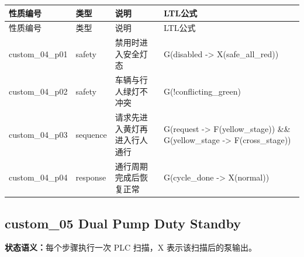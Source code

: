 \begin{longtable}{L{2.3cm}L{1.7cm}L{4.1cm}L{5.2cm}}

\toprule

性质编号 & 类型 & 说明 & LTL公式\\

\midrule

\endfirsthead

\toprule

性质编号 & 类型 & 说明 & LTL公式\\

\midrule

\endhead

{\ttfamily custom\_04\_p01} & safety & 禁用时进入安全灯态 & {\ttfamily G(disabled -> X(safe\_all\_red))}\\

{\ttfamily custom\_04\_p02} & safety & 车辆与行人绿灯不冲突 & {\ttfamily G(!conflicting\_green)}\\

{\ttfamily custom\_04\_p03} & sequence & 请求先进入黄灯再进入行人通行 & {\ttfamily G(request -> F(yellow\_stage)) \&\& G(yellow\_stage -> F(cross\_stage))}\\

{\ttfamily custom\_04\_p04} & response & 通行周期完成后恢复正常 & {\ttfamily G(cycle\_done -> X(normal))}\\

\bottomrule

\end{longtable}

\subsection{{\ttfamily custom\_05} Dual Pump Duty Standby}

\noindent\textbf{状态语义：}每个步骤执行一次 PLC 扫描，X 表示该扫描后的泵输出。

